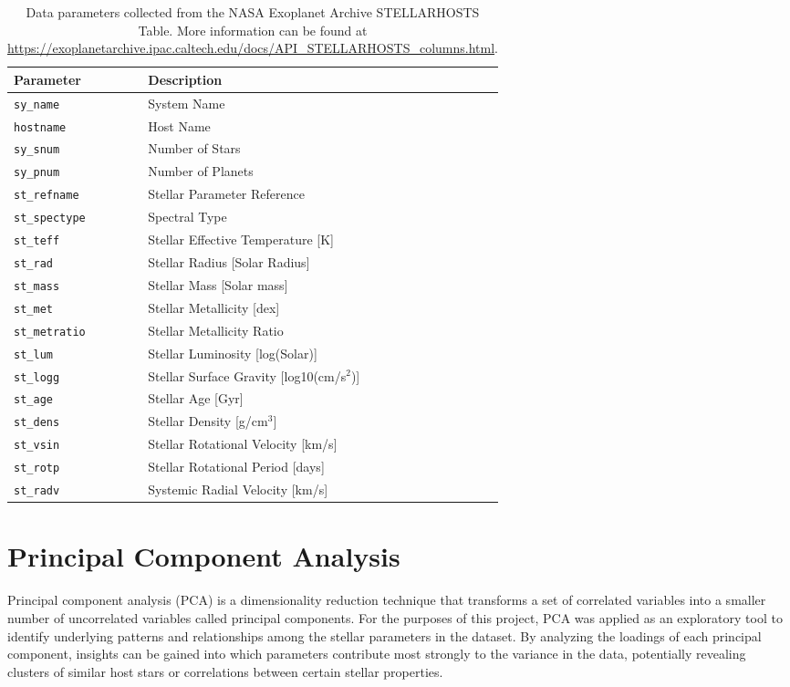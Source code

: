 \documentclass[preprint]{aastex631}
\begin{document}
\begin{table}
  \centering
  \begin{tabular}{ll}
    \hline
    \textbf{Parameter} & \textbf{Description} \\
    \hline
    \verb|sy_name| & System Name \\
    \verb|hostname| & Host Name \\
    \verb|sy_snum| & Number of Stars \\
    \verb|sy_pnum| & Number of Planets \\
    \verb|st_refname| & Stellar Parameter Reference \\
    \verb|st_spectype| & Spectral Type \\
    \verb|st_teff| & Stellar Effective Temperature [K] \\
    \verb|st_rad| & Stellar Radius [Solar Radius] \\
    \verb|st_mass| & Stellar Mass [Solar mass] \\
    \verb|st_met| & Stellar Metallicity [dex] \\
    \verb|st_metratio| & Stellar Metallicity Ratio \\
    \verb|st_lum| & Stellar Luminosity [log(Solar)] \\
    \verb|st_logg| & Stellar Surface Gravity [log10(cm/s$^2$)] \\
    \verb|st_age| & Stellar Age [Gyr] \\
    \verb|st_dens| & Stellar Density [g/cm$^3$] \\
    \verb|st_vsin| & Stellar Rotational Velocity [km/s] \\
    \verb|st_rotp| & Stellar Rotational Period [days] \\
    \verb|st_radv| & Systemic Radial Velocity [km/s] \\
    \hline
  \end{tabular}
  \caption{Data parameters collected from the NASA Exoplanet Archive STELLARHOSTS Table. More information can be found at \url{https://exoplanetarchive.ipac.caltech.edu/docs/API_STELLARHOSTS_columns.html}.}
  \label{tab:data_parameters}
\end{table}

\section{Principal Component Analysis}
Principal component analysis (PCA) is a dimensionality reduction technique that transforms a set of correlated variables into a smaller number of uncorrelated variables called principal components. For the purposes of this project, PCA was applied as an exploratory tool to identify underlying patterns and relationships among the stellar parameters in the dataset. By analyzing the loadings of each principal component, insights can be gained into which parameters contribute most strongly to the variance in the data, potentially revealing clusters of similar host stars or correlations between certain stellar properties.
\end{document}
